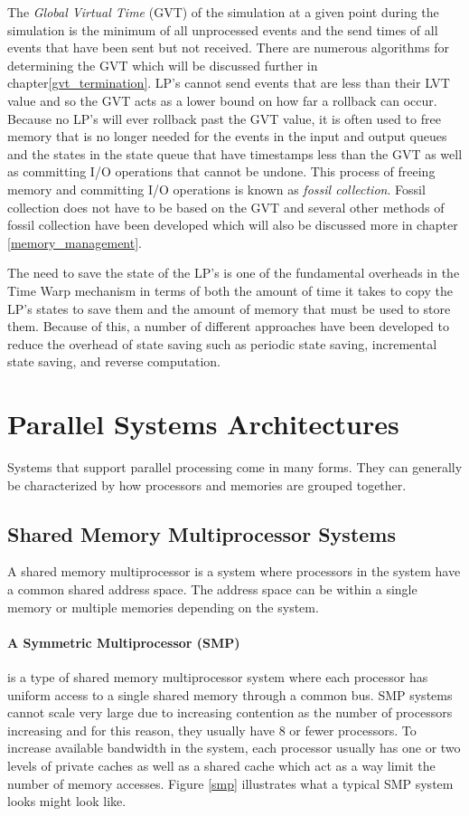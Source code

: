 \documentclass[11pt]{book}
\begin{document}
The \emph{Global Virtual Time} (GVT) of the simulation at a given point during the simulation
is the minimum of all unprocessed events and the send times of all events that have been
sent but not received\cite{jefferson-85}. There are numerous algorithms for determining
the GVT which will be discussed further in chapter\ref{gvt_termination}. LP's cannot send
events that are less than their LVT value and so the GVT acts as a lower bound on how far
a rollback can occur. Because no LP's will ever rollback past the GVT value, it is often
used to free memory that is no longer needed for the events in the input and output queues
and the states in the state queue that have timestamps less than the GVT as well as committing
I/O operations that cannot be undone. This process of freeing memory and committing I/O
operations is known as \emph{fossil collection}. Fossil collection does not have to be based
on the GVT and several other methods of fossil collection have been developed which will
also be discussed more in chapter \ref{memory_management}.

The need to save the state of the LP's is one of the fundamental overheads in the Time Warp
mechanism in terms of both the amount of time it takes to copy the LP's states to save them
and the amount of memory that must be used to store them. Because of this, a number of
different approaches have been developed to reduce the overhead of state saving such as
periodic state saving, incremental state saving, and reverse computation.

\section{Parallel Systems Architectures}

Systems that support parallel processing come in many forms. They can generally be
characterized by how processors and memories are grouped together.

\subsection{Shared Memory Multiprocessor Systems}

A shared memory multiprocessor is a system where processors in the system have a common
shared address space. The address space can be within a single memory or multiple memories
depending on the system.

\paragraph{A Symmetric Multiprocessor (SMP)} is a type of shared memory multiprocessor
system where each processor has uniform access to a single shared memory through a common
bus. SMP systems cannot scale very large due to increasing contention as the number of
processors increasing and for this reason, they usually have 8 or fewer processors.
To increase available bandwidth in the system, each processor usually has one or two
levels of private caches as well as a shared cache which act as a way limit the number of
memory accesses. Figure \ref{smp} illustrates what a typical SMP system looks might look
like.
\end{document}
